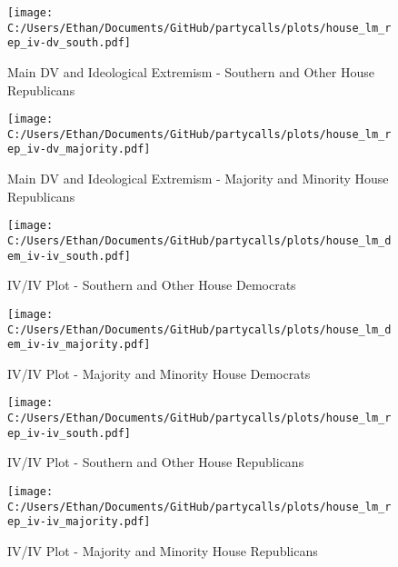 \documentclass[12pt]{article}
\begin{document}
\begin{figure}[ht]
	\caption{Main DV and Ideological Extremism - Southern and Other House Republicans}
	\texttt{[image: C:/Users/Ethan/Documents/GitHub/partycalls/plots/house\_lm\_rep\_iv-dv\_south.pdf]}
\end{figure}

\begin{figure}[ht]
	\caption{Main DV and Ideological Extremism - Majority and Minority House Republicans}
	\texttt{[image: C:/Users/Ethan/Documents/GitHub/partycalls/plots/house\_lm\_rep\_iv-dv\_majority.pdf]}
\end{figure}

\begin{figure}[ht]
	\caption{IV/IV Plot - Southern and Other House Democrats}
	\texttt{[image: C:/Users/Ethan/Documents/GitHub/partycalls/plots/house\_lm\_dem\_iv-iv\_south.pdf]}
\end{figure}

\begin{figure}[ht]
	\caption{IV/IV Plot - Majority and Minority House Democrats}
	\texttt{[image: C:/Users/Ethan/Documents/GitHub/partycalls/plots/house\_lm\_dem\_iv-iv\_majority.pdf]}
\end{figure}

\begin{figure}[ht]
	\caption{IV/IV Plot - Southern and Other House Republicans}
	\texttt{[image: C:/Users/Ethan/Documents/GitHub/partycalls/plots/house\_lm\_rep\_iv-iv\_south.pdf]}
\end{figure}

\begin{figure}[ht]
	\caption{IV/IV Plot - Majority and Minority House Republicans}
	\texttt{[image: C:/Users/Ethan/Documents/GitHub/partycalls/plots/house\_lm\_rep\_iv-iv\_majority.pdf]}
\end{figure}
\end{document}
